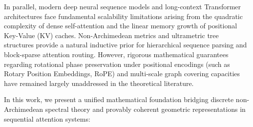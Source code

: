 \documentclass[11pt,reqno]{article}
\theoremstyle{plain}
\theoremstyle{definition}
\theoremstyle{remark}
\begin{document}
In parallel, modern deep neural sequence models and long-context Transformer architectures face fundamental scalability limitations arising from the quadratic complexity of dense self-attention and the linear memory growth of positional Key-Value (KV) caches. Non-Archimedean metrics and ultrametric tree structures provide a natural inductive prior for hierarchical sequence parsing and block-sparse attention routing. However, rigorous mathematical guarantees regarding rotational phase preservation under positional encodings (such as Rotary Position Embeddings, RoPE) and multi-scale graph covering capacities have remained largely unaddressed in the theoretical literature.

In this work, we present a unified mathematical foundation bridging discrete non-Archimedean spectral theory and provably coherent geometric representations in sequential attention systems:
\end{document}
